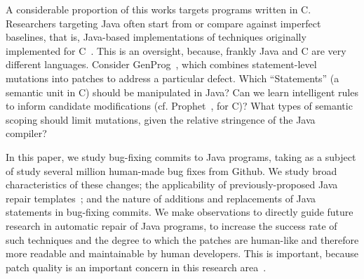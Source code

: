 \documentclass{sig-alternate-05-2015}
\begin{document}
A considerable proportion of this works targets programs written in C.
Researchers targeting Java often start from or compare against imperfect
baselines, that is, Java-based implementations of techniques originally
implemented for C~\cite{nopol,kim2013}. %
%
This is an oversight, because, frankly Java and C are very different languages.
Consider GenProg~\cite{legoues2012}, which
combines statement-level mutations into patches to address a particular
defect. Which ``Statements'' (a semantic unit in C) should be manipulated in Java?
Can we learn
intelligent rules to inform candidate modifications
(cf. Prophet~\cite{Long2016}, for C)?  What types of semantic scoping
should limit mutations, given the relative stringence of the Java
compiler?

In this paper, we study bug-fixing commits to Java programs, taking as a subject
of study several million human-made bug fixes from Github. We study broad
characteristics of these changes; the applicability of previously-proposed
Java repair templates~\cite{kim2013}; and the nature
of additions and replacements of Java statements in bug-fixing commits. We make
observations to directly guide future research in automatic repair of Java
programs, to increase the success rate of such techniques and the degree to
which the patches are human-like and therefore more readable and maintainable by
human developers. This is important, because patch quality is an important
concern in this research area~\cite{Qi15}.

\end{document}
